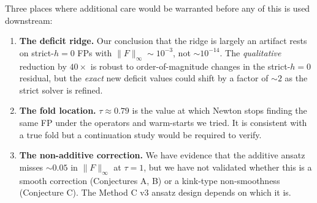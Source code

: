 \documentclass[11pt]{article}
\begin{document}
Three places where additional care would be warranted before any of
this is used downstream:

\begin{enumerate}\itemsep1pt
  \item \textbf{The deficit ridge.} Our conclusion that the ridge is
        largely an artifact rests on strict-$h{=}0$ FPs with
        $\|F\|_\infty \sim 10^{-3}$, not $\sim 10^{-14}$. The
        \emph{qualitative} reduction by $40{\times}$ is robust to
        order-of-magnitude changes in the strict-$h{=}0$ residual,
        but the \emph{exact} new deficit values could shift by a
        factor of $\sim 2$ as the strict solver is refined.
  \item \textbf{The fold location.} $\tau \approx 0.79$ is the value
        at which Newton stops finding the same FP under the operators
        and warm-starts we tried. It is consistent with a true fold
        but a continuation study would be required to verify.
  \item \textbf{The non-additive correction.} We have evidence that
        the additive ansatz misses $\sim 0.05$ in $\|F\|_\infty$ at
        $\tau = 1$, but we have not validated whether this is a
        smooth correction (Conjectures A, B) or a kink-type
        non-smoothness (Conjecture C). The Method C v3 ansatz design
        depends on which it is.
\end{enumerate}
\end{document}
